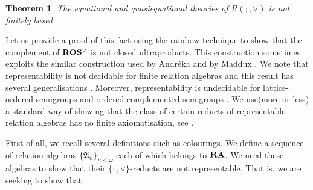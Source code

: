 \documentclass[a4paper]{article}
\theoremstyle{defin}
\theoremstyle{theorem}
\newtheorem{theorem}{Theorem}
\theoremstyle{prop}
\theoremstyle{lemma}
\theoremstyle{ex}
\theoremstyle{col}
\begin{document}
\begin{theorem}
  The equational and quasiequational theories of $R(;,\vee)$ is not finitely based.
\end{theorem}

Let us provide a proof of this fact using the rainbow technique \cite{hirsch2002relation} to show that the complement of ${\bf ROS^{\vee}}$ is not closed ultraproducts. This construction sometimes exploits the similar construction used by Andr{\'e}ka \cite{andreka1991representations} and by Maddux \cite{maddux_1989}.
We note that representability is not decidable for finite relation algebras \cite{hirsch2001representability} and this result has several generalisations \cite{hirsch2012undecidability}. Moreover, representability is undecidable for lattice-ordered semigroups and ordered complemented semigroups \cite{neuzerling2016undecidability}. We use(more or less) a standard way of showing that the class of certain reducts of representable relation algebras has no finite axiomatisation, see \cite{hodkinson2000axiomatizability} \cite{hirsch1997step}.

First of all, we recall several definitions such as colourings. We define a sequence of relation algebras $\{ \mathfrak{A}_n \}_{n < \omega}$ each of which belongs to ${\bf RA}$. We need these algebras to show that their $\{;, \vee\}$-reducts are not representable. That is, we are seeking to show that
\end{document}
